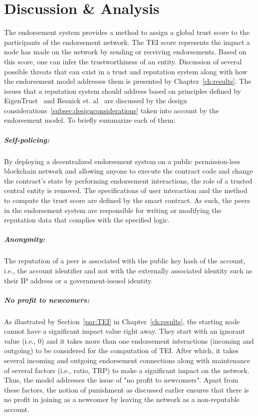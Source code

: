 \chapter{Discussion \& Analysis} \label{ch:discussion}
The endorsement system provides a method to assign a global trust score to the
participants of the endorsement network. The \ac{TEI} score represents the
impact a node has made on the network by sending or receiving endorsements.
Based on this score, one can infer the trustworthiness of an entity. Discussion
of several possible threats that can exist in a trust and reputation system
along with how the endorsement model addresses them is presented by
Chapter~\ref{ch:results}. The issues that a reputation system should address
based on principles defined by EigenTrust~\cite{kamvar2003eigentrust} and
Resnick et. al~\cite{resnick2000reputation} are discussed by the design
considerations~\ref{subsec:designconsiderations} taken into account by the
endorsement model. To briefly summarize each of them:  

\paragraph{Self-policing:}By deploying a decentralized endorsement system on a
public permission-less blockchain network and allowing anyone to execute the
contract code and change the contract's state by performing endorsement
interactions, the role of a trusted central entity is removed. The
specifications of user interaction and the method to compute the trust score
are defined by the smart contract. As such, the peers in the endorsement system
are responsible for writing or modifying the reputation data that complies with
the specified logic.   
\paragraph{Anonymity:} The reputation of a peer is associated with the public
key hash of the account, i.e., the account identifier and not with the
externally associated identity such as their IP address or a government-issued
identity.  
\paragraph{No profit to newcomers:}As illustrated by Section~\ref{par:TEI} in
Chapter~\ref{ch:results}, the starting node cannot have a significant impact
value right away. They start with an ignorant value (i.e., 0) and it takes more
than one endorsement interactions (incoming and outgoing) to be considered for
the computation of \ac{TEI}. After which, it takes several incoming and
outgoing endorsement connections along with maintenance of several factors
(i.e., ratio, \ac{TRP}) to make a significant impact on the network. Thus, the
model addresses the issue of "no profit to newcomers". Apart from these
factors, the notion of punishment as discussed earlier ensures that there is no
profit in joining as a newcomer by leaving the network as a non-reputable
account.   
